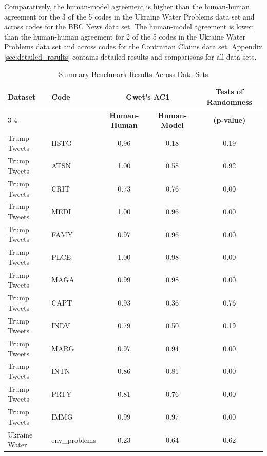 \documentclass{article}
\begin{document}
Comparatively, the human-model agreement is higher than the human-human agreement for the 3 of the 5 codes in the Ukraine Water Problems data set and across codes for the BBC News data set.  The human-model agreement is lower than the human-human agreement for 2 of the 5 codes in the Ukraine Water Problems data set and across codes for the Contrarian Claims data set.   Appendix \ref{sec:detailed_results} contains detailed results and comparisons for all data sets. 

\begin{table}[!htb]
\caption{Summary Benchmark Results Across Data Sets}
\vspace*{2.5mm}
\begin{tabular}{@{}llccc@{}}
\toprule
\multirow{2}{*}{\textbf{Dataset}} & \multirow{2}{*}{\textbf{Code}} & \multicolumn{2}{c}{\textbf{Gwet's AC1}} & \multicolumn{1}{c}{\multirow{2}{*}{\textbf{Tests of Randomness}}} \\ \cmidrule(lr){3-4}
 &   & \textbf{Human-Human}  & \textbf{Human-Model}  &  \multicolumn{1}{c}{\textbf{(p-value)}}                         \\ \midrule
Trump Tweets      & HSTG          & 0.96 & 0.18 & 0.19 \\[0.5mm] 
Trump Tweets      & ATSN          & 1.00 & 0.58 & 0.92 \\[0.5mm] 
Trump Tweets      & CRIT          & 0.73 & 0.76 & 0.00 \\[0.5mm] 
Trump Tweets      & MEDI          & 1.00 & 0.96 & 0.00 \\[0.5mm] 
Trump Tweets      & FAMY          & 0.97 & 0.96 & 0.00 \\[0.5mm] 
Trump Tweets      & PLCE          & 1.00 & 0.98 & 0.00 \\[0.5mm] 
Trump Tweets      & MAGA          & 0.99 & 0.98 & 0.00 \\[0.5mm] 
Trump Tweets      & CAPT          & 0.93 & 0.36 & 0.76 \\[0.5mm] 
Trump Tweets      & INDV          & 0.79 & 0.50 & 0.19 \\[0.5mm] 
Trump Tweets      & MARG          & 0.97 & 0.94 & 0.00 \\[0.5mm] 
Trump Tweets      & INTN          & 0.86 & 0.81 & 0.00 \\[0.5mm] 
Trump Tweets      & PRTY          & 0.81 & 0.76 & 0.00 \\[0.5mm] 
Trump Tweets      & IMMG          & 0.99 & 0.97 & 0.00 \\[0.5mm] 
Ukraine Water     & env\_problems & 0.23 & 0.64 & 0.62 \\[0.5mm] 

\end{tabular}
\end{table}
\end{document}
